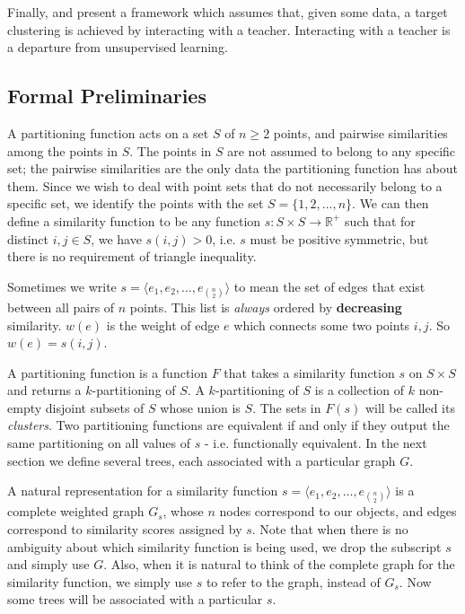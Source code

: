 \documentclass[twoside,11pt]{article}
\begin{document}
Finally, \cite{BBV08} and \cite{awasthisupervised} present a framework which assumes that, given some data, 
a target clustering is achieved by interacting with a teacher. Interacting with a teacher is a departure from unsupervised learning.

\subsection{Formal Preliminaries} \label{formal}

A partitioning function acts on a set $S$ of $n \ge 2$ points, and pairwise similarities among the points in $S$. The points in $S$ are not assumed to belong to any specific set; the pairwise similarities are the only data the partitioning function has about them. Since we wish to deal with point sets that do not necessarily belong to a specific set, we identify the points with the set $S = \{1, 2, . . . , n\}$. We can then define a similarity function to be any function $s : S \times S \rightarrow \mathbb{R}^+$  such that for distinct $i, j \in S$, we have $s(i, j) > 0$, i.e. $s$ must be positive symmetric, but there is no requirement of triangle inequality.

Sometimes we write $s = \langle e_1, e_2, \ldots, e_{n \choose 2} \rangle$ to mean the set of edges that exist between all pairs of $n$ points. This list is \textit{always} ordered by \textbf{decreasing} similarity. $w(e)$ is the weight of edge $e$ which connects some two points $i, j$. So $w(e) = s(i, j)$.

A partitioning function is a function $F$ that takes a similarity function $s$ on $S \times S$ and returns a $k$-partitioning of $S$. A $k$-partitioning of $S$ is a collection of $k$ non-empty disjoint subsets of $S$ whose union is $S$. The sets in $F(s)$ will be called its \textit{clusters}. Two partitioning functions are equivalent if and only if they output the same partitioning on all values of $s$ - i.e. functionally equivalent. In the next section we define several trees, each associated with a particular graph $G$.

A natural representation for a similarity function $s = \langle e_1, e_2, \ldots, e_{n \choose 2} \rangle$ is a complete weighted graph $G_s$,
whose $n$ nodes correspond to our objects, and edges correspond to similarity scores assigned by $s$.  Note that when there is no ambiguity about which similarity function is being used, we drop the subscript $s$ and simply use $G$. Also, when it is natural to think of the complete graph for the similarity function, we simply use $s$ to refer to the graph, instead of $G_s$. Now some trees will be associated with a particular $s$.
\end{document}
